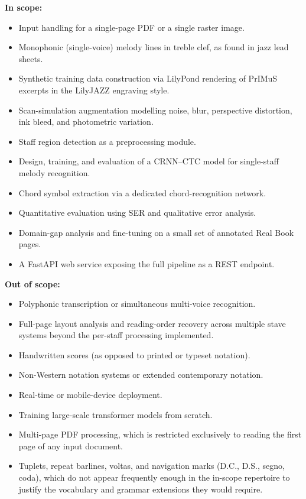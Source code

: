 \textbf{In scope:}
\begin{itemize}
    \item Input handling for a single-page PDF or a single raster image.
    \item Monophonic (single-voice) melody lines in treble clef, as found in jazz lead
          sheets.
    \item Synthetic training data construction via LilyPond rendering of PrIMuS
          excerpts in the LilyJAZZ engraving style.
    \item Scan-simulation augmentation modelling noise, blur, perspective distortion,
          ink bleed, and photometric variation.
    \item Staff region detection as a preprocessing module.
    \item Design, training, and evaluation of a CRNN--CTC model for single-staff
          melody recognition.
    \item Chord symbol extraction via a dedicated chord-recognition network.
    \item Quantitative evaluation using SER and qualitative error analysis.
    \item Domain-gap analysis and fine-tuning on a small set of annotated Real Book
          pages.
    \item A FastAPI web service exposing the full pipeline as a REST endpoint.
\end{itemize}

\textbf{Out of scope:}
\begin{itemize}
    \item Polyphonic transcription or simultaneous multi-voice recognition.
    \item Full-page layout analysis and reading-order recovery across multiple stave
          systems beyond the per-staff processing implemented.
    \item Handwritten scores (as opposed to printed or typeset notation).
    \item Non-Western notation systems or extended contemporary notation.
    \item Real-time or mobile-device deployment.
    \item Training large-scale transformer models from scratch.
    \item Multi-page PDF processing, which is restricted exclusively to reading the
          first page of any input document.
    \item Tuplets, repeat barlines, voltas, and navigation marks (D.C., D.S., segno,
          coda), which do not appear frequently enough in the in-scope repertoire to
          justify the vocabulary and grammar extensions they would require.
\end{itemize}

